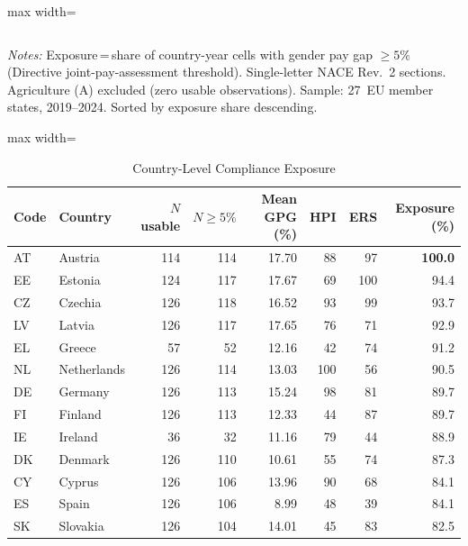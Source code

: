 \documentclass[12pt,a4paper]{article}
\begin{document}
\begin{table}[htbp]
\begin{threeparttable}
\begin{adjustbox}{max width=\textwidth}
\begin{tabular}{p{8.5cm}rrrr}
\bottomrule
\end{tabular}
\end{adjustbox}
\begin{tablenotes}
\footnotesize
\item \textit{Notes:} Exposure\,=\,share of country-year cells with gender pay
  gap $\geq 5\%$ (Directive joint-pay-assessment threshold).  Single-letter
  NACE Rev.~2 sections.  Agriculture (A) excluded (zero usable observations).
  Sample: 27~EU member states, 2019--2024.  Sorted by exposure share
  descending.
\end{tablenotes}
\end{threeparttable}
\end{table}

\begin{table}[htbp]
\caption{Country-Level Compliance Exposure}
\label{tab:countryexposure}
\begin{threeparttable}
\begin{adjustbox}{max width=\textwidth}
\begin{tabular}{llrrrrrr}
\toprule
Code & Country & $N$ usable & $N \geq 5\%$ & Mean GPG (\%) & HPI & ERS & Exposure (\%) \\
\midrule
AT & Austria     & 114 & 114 & 17.70 &  88 &  97 & \textbf{100.0} \\
EE & Estonia     & 124 & 117 & 17.67 &  69 & 100 & 94.4 \\
CZ & Czechia     & 126 & 118 & 16.52 &  93 &  99 & 93.7 \\
LV & Latvia      & 126 & 117 & 17.65 &  76 &  71 & 92.9 \\
EL & Greece      &  57 &  52 & 12.16 &  42 &  74 & 91.2 \\
NL & Netherlands & 126 & 114 & 13.03 & 100 &  56 & 90.5 \\
DE & Germany     & 126 & 113 & 15.24 &  98 &  81 & 89.7 \\
FI & Finland     & 126 & 113 & 12.33 &  44 &  87 & 89.7 \\
IE & Ireland     &  36 &  32 & 11.16 &  79 &  44 & 88.9 \\
DK & Denmark     & 126 & 110 & 10.61 &  55 &  74 & 87.3 \\
CY & Cyprus      & 126 & 106 & 13.96 &  90 &  68 & 84.1 \\
ES & Spain       & 126 & 106 &  8.99 &  48 &  39 & 84.1 \\
SK & Slovakia    & 126 & 104 & 14.01 &  45 &  83 & 82.5 \\

\end{tabular}
\end{adjustbox}
\end{threeparttable}
\end{table}
\end{document}

